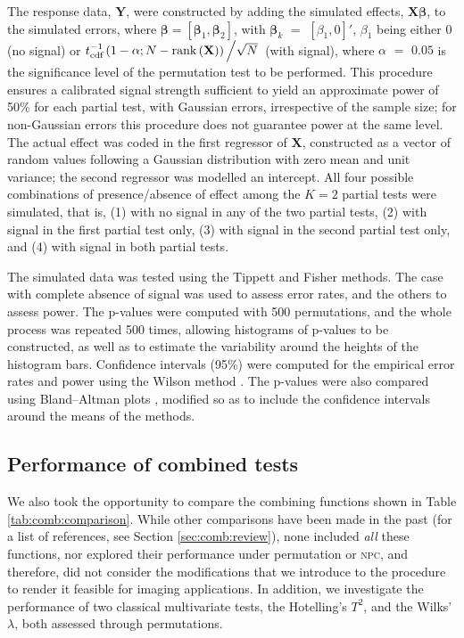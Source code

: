 The response data, $\mathbf{Y}$, were constructed by adding the simulated effects, $\mathbf{X}\boldsymbol{\beta}$, to the simulated errors, where $\boldsymbol{\beta} = \left[\boldsymbol{\beta}_1,\boldsymbol{\beta}_2\right]$, with $\boldsymbol{\beta}_k$ $=$ $[\beta_1, 0]'$, $\beta_1$ being either 0 (no signal) or $t^{-1}_{\text{cdf}}\left(1-\alpha ; N-\mathrm{rank}\left(\mathbf{X}\right)\right)\left/\sqrt{N}\right.$ (with signal), where $\alpha$ $=$ $0.05$ is the significance level of the permutation test to be performed. This procedure ensures a calibrated signal strength sufficient to yield an approximate power of 50\% for each partial test, with Gaussian errors, irrespective of the sample size; for non-Gaussian errors this procedure does not guarantee power at the same level. The actual effect was coded in the first regressor of $\mathbf{X}$, constructed as a vector of random values following a Gaussian distribution with zero mean and unit variance; the second regressor was modelled an intercept. All four possible combinations of presence/absence of effect among the $K=2$ partial tests were simulated, that is, (1) with no signal in any of the two partial tests, (2) with signal in the first partial test only, (3) with signal in the second partial test only, and (4) with signal in both partial tests.

The simulated data was tested using the Tippett and Fisher methods. The case with complete absence of signal was used to assess error rates, and the others to assess power. The p-values were computed with 500 permutations, and the whole process was repeated 500 times, allowing histograms of p-values to be constructed, as well as to estimate the variability around the heights of the histogram bars. Confidence intervals (95\%) were computed for the empirical error rates and power using the Wilson method \citep{Wilson1927}. The p-values were also compared using Bland--Altman plots \citep{Bland1986}, modified so as to include the confidence intervals around the means of the methods.

\subsection{Performance of combined tests}

We also took the opportunity to compare the combining functions shown in Table \ref{tab:comb:comparison}. While other comparisons have been made in the past (for a list of references, see Section \ref{sec:comb:review}), none included \emph{all} these functions, nor explored their performance under permutation or \textsc{npc}, and therefore, did not consider the modifications that we introduce to the procedure to render it feasible for imaging applications. In addition, we investigate the performance of two classical multivariate tests, the Hotelling's $T^2$, and the Wilks' $\lambda$, both assessed through permutations.

